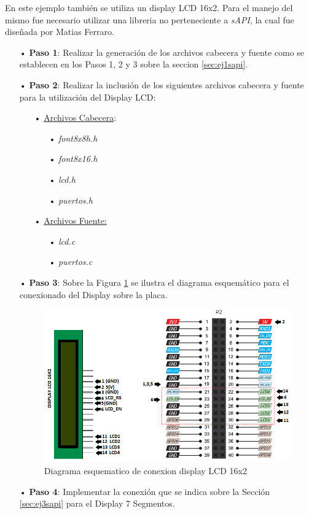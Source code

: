 \documentclass[12pt,letterpaper]{article}
\begin{document}
En este ejemplo también se utiliza un display LCD 16x2. Para el manejo del mismo fue necesario utilizar una libreria no perteneciente a \textit{sAPI}, la cual fue diseñada por Matias Ferraro\cite{repositoriomatiasferraro}.
\begin{enumerate}
\item[•]\textbf{Paso 1}: Realizar la generación de los archivos cabecera y fuente como se establecen en los Pasos 1, 2 y 3 sobre la seccion \ref{sec:ej1sapi}.
\item[•]\textbf{Paso 2}: Realizar la inclusión de los siguientes archivos cabecera y fuente para la utilización del Display LCD:
\begin{enumerate}
\item[•]\underline{Archivos Cabecera}:
\begin{enumerate}
\item[•]\textit{font8x8h.h}
\item[•]\textit{font8x16.h}
\item[•]\textit{lcd.h}
\item[•]\textit{puertos.h}
\end{enumerate}
\item[•]\underline{Archivos Fuente:}
\begin{enumerate}
\item[•]\textit{lcd.c}
\item[•]\textit{puertos.c}
\end{enumerate}
\end{enumerate}
\item[•]\textbf{Paso 3}: Sobre la Figura \ref{Fig31} se ilustra el diagrama esquemático para el conexionado del Display sobre la placa.


\begin{figure}[H]
\centering
\includegraphics[width=8 cm]{figuras/f13.png}
\caption{Diagrama esquematico de conexion display LCD 16x2}
\label{Fig31}
\end{figure}


\item[•]\textbf{Paso 4}: Implementar la conexión que se indica sobre la Sección \ref{sec:ej3sapi} para el Display 7 Segmentos.

\end{enumerate}
\end{document}
